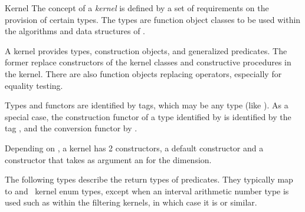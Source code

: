 \begin{ccRefConcept}{Kernel}
The concept of a {\em kernel} is defined by a set of requirements on
the provision of certain types.  The types are function object classes to be
used within the algorithms and data structures of \cgal.

A kernel provides types, construction objects, and generalized predicates.
The former replace constructors of the kernel classes and constructive
procedures in the kernel. There are also function objects replacing operators,
especially for equality testing.

Types and functors are identified by tags, which may be any type (like ). As a special case, the construction functor of a type identified by  is identified by the tag , and the conversion functor by .

Depending on , a kernel has 2 constructors, a default constructor and a constructor that takes as argument an  for the dimension.

\ccTypes

\ccGlue
{}

\ccGlue
{}


The following types describe the return types of predicates.  They typically
map to  and \cgal\ kernel enum types, except when an interval arithmetic
number type is used such as within the filtering kernels, in which case it is
 or similar.

\ccGlue
{}
\ccGlue
{}
\ccGlue
{}
\ccGlue
{}
\ccGlue
{}
\ccGlue
{}


\end{ccRefConcept}
